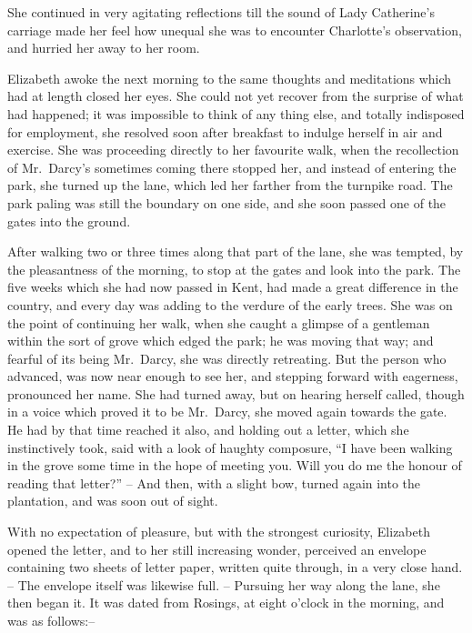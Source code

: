 She continued in very agitating reflections till the sound
of Lady Catherine’s carriage made her feel how unequal
she was to encounter Charlotte’s observation, and hurried
her away to her room.


Elizabeth awoke the next morning to the same
thoughts and meditations which had at length closed her
eyes. She could not yet recover from the surprise of what
had happened; it was impossible to think of any thing
else, and totally indisposed for employment, she resolved
soon after breakfast to indulge herself in air and exercise.
She was proceeding directly to her favourite walk, when
the recollection of Mr.\ Darcy’s sometimes coming there
stopped her, and instead of entering the park, she turned
up the lane, which led her farther from the turnpike road.
The park paling was still the boundary on one side, and
she soon passed one of the gates into the ground.

After walking two or three times along that part of the
lane, she was tempted, by the pleasantness of the morning,
to stop at the gates and look into the park. The five
weeks which she had now passed in Kent, had made
a great difference in the country, and every day was adding
to the verdure of the early trees. She was on the point
of continuing her walk, when she caught a glimpse of
a gentleman within the sort of grove which edged the
park; he was moving that way; and fearful of its being
Mr.\ Darcy, she was directly retreating. But the person
who advanced, was now near enough to see her, and
stepping forward with eagerness, pronounced her name.
She had turned away, but on hearing herself called,
though in a voice which proved it to be Mr.\ Darcy, she
moved again towards the gate. He had by that time
reached it also, and holding out a letter, which she
instinctively took, said with a look of haughty composure,
“I have been walking in the grove some time in the hope
of meeting you. Will you do me the honour of reading
that letter?” -- And then, with a slight bow, turned again
into the plantation, and was soon out of sight.

With no expectation of pleasure, but with the strongest
curiosity, Elizabeth opened the letter, and to her still
increasing wonder, perceived an envelope containing two
sheets of letter paper, written quite through, in a very
close hand. -- The envelope itself was likewise full. --
Pursuing her way along the lane, she then began it. It
was dated from Rosings, at eight o’clock in the morning,
and was as follows:--

